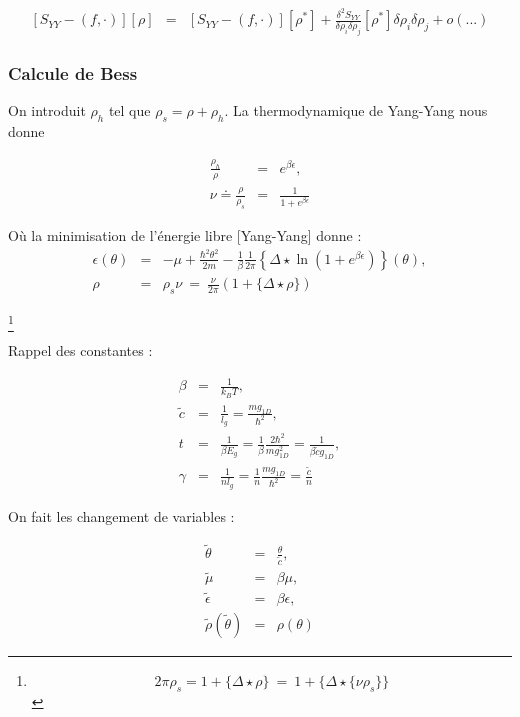 	\begin{eqnarray}
		\left [ S_{YY}  - (   f ,  \cdot  )  \right ] [\rho ] & = &  \left [ S_{YY}  - (   f ,  \cdot  )  \right ] [\rho^\ast  ]  + 	\frac{\delta^2 S_{YY} }{\delta \rho_i \delta \rho_j  }   [\rho^\ast  ] \delta \rho_i \delta \rho_j + o (...) 
	\end{eqnarray} 


	
	
\subsubsection{Calcule de Bess}

On introduit $\rho_h$ tel que $\rho_s = \rho + \rho_h$. La thermodynamique de Yang-Yang nous donne 

\begin{eqnarray}
	\frac{\rho_h}{\rho} & = & e^{\beta \epsilon }, \\
	\nu \doteq \frac{\rho}{\rho_s} & = & \frac{1}{1+ e ^{\beta \epsilon} }	
\end{eqnarray}

Où la minimisation de l'énergie libre [Yang-Yang] donne :
\begin{eqnarray}
	\epsilon ( \theta ) & = & - \mu + \frac{\hbar^2 \theta^2 }{2 m} - \frac{1}{ \beta } \frac{1}{2 \pi} \left \{\Delta \star \ln \left ( 1 + e^{\beta \epsilon} \right )  \right \} ( \theta ), \\
	\rho &=&  \rho_s \nu   ~=~   \frac{\nu}{2 \pi } ( 1 + \{ \Delta \star \rho \} ) 	
\end{eqnarray}

\footnote{$$ 	2\pi \rho_s  =  1 + \{ \Delta \star \rho \} ~= ~ 1 + \{ \Delta \star \{\nu \rho_s\} \} $$}

Rappel des constantes :

\begin{eqnarray*}
	\beta & = & \frac{1}{ k_B T} ,\\
	\tilde{c} & =& \frac{1}{l_g}  = \frac{ m g_{1D}}{\hbar^2},\\
	t & = & \frac{1}{\beta E_g} = \frac{1}{ \beta} \frac{2 \hbar^2 }	{ m g_{1D}^2 } = \frac{1}{ \beta  \tilde{c} g_{1D} },\\
	\gamma & = & \frac{1}{n l_g } = \frac{1}{n} \frac{ m g_{1D}}{\hbar^2} = \frac{\tilde{c}}{n} 
\end{eqnarray*}

On fait les changement de variables :

\begin{eqnarray*}
	\tilde{\theta} & = & \frac{\theta}{\tilde {c}},\\
	\tilde{\mu} & =& \beta \mu ,\\
	\tilde{\epsilon} & = & \beta \epsilon , \\
	\tilde{\rho}(\tilde{\theta}) & = & \rho ( \theta ) 	
\end{eqnarray*}


